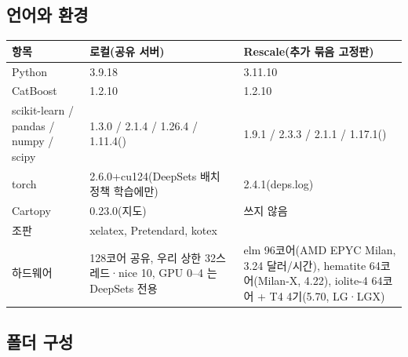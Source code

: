 \subsection{언어와 환경}

\begin{center}\tabsmall
\begin{tabularx}{\textwidth}{@{}>{\raggedright\arraybackslash}p{3.0cm}YY@{}}
\toprule
항목 & 로컬(공유 서버) & Rescale(추가 묶음 고정판) \\
\midrule
Python & 3.9.18 & 3.11.10 \\
CatBoost & 1.2.10 & 1.2.10 \\
scikit-learn / pandas / numpy / scipy & 1.3.0 / 2.1.4 / 1.26.4 / 1.11.4() & 1.9.1 / 2.3.3 / 2.1.1 / 1.17.1() \\
torch & 2.6.0+cu124(DeepSets 배치 정책 학습에만) & 2.4.1(deps.log) \\
Cartopy & 0.23.0(지도) & 쓰지 않음 \\
조판 & xelatex, Pretendard, kotex & \\
하드웨어 & 128코어 공유, 우리 상한 32스레드·nice 10, GPU 0–4 는 DeepSets 전용 & elm 96코어(AMD EPYC Milan, 3.24 달러/시간), hematite 64코어(Milan-X, 4.22), iolite-4 64코어 + T4 4기(5.70, LG·LGX) \\
\bottomrule
\end{tabularx}
\end{center}

\subsection{폴더 구성}

